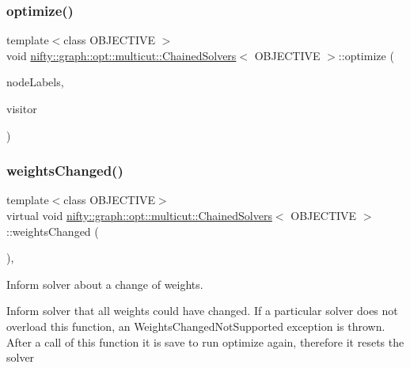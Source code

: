 \subsubsection{\texorpdfstring{optimize()}{optimize()}}
{\footnotesize\ttfamily template$<$class O\+B\+J\+E\+C\+T\+I\+VE $>$ \\
void \hyperlink{classnifty_1_1graph_1_1opt_1_1multicut_1_1ChainedSolvers}{nifty\+::graph\+::opt\+::multicut\+::\+Chained\+Solvers}$<$ O\+B\+J\+E\+C\+T\+I\+VE $>$\+::optimize (\begin{DoxyParamCaption}\item[{\hyperlink{classnifty_1_1graph_1_1opt_1_1multicut_1_1ChainedSolvers_a44d5163a198e88948d9301370c2aead5}{Node\+Labels\+Type} \&}]{node\+Labels,  }\item[{\hyperlink{classnifty_1_1graph_1_1opt_1_1multicut_1_1ChainedSolvers_a2023073333edc978eca4a4fb8d06ae1b}{Visitor\+Base\+Type} $\ast$}]{visitor }\end{DoxyParamCaption})\hspace{0.3cm}{\ttfamily [virtual]}}

\mbox{\label{classnifty_1_1graph_1_1opt_1_1multicut_1_1ChainedSolvers_ac87503e00006560417c7ab7af4685383}} 
\subsubsection{\texorpdfstring{weights\+Changed()}{weightsChanged()}}
{\footnotesize\ttfamily template$<$class O\+B\+J\+E\+C\+T\+I\+VE$>$ \\
virtual void \hyperlink{classnifty_1_1graph_1_1opt_1_1multicut_1_1ChainedSolvers}{nifty\+::graph\+::opt\+::multicut\+::\+Chained\+Solvers}$<$ O\+B\+J\+E\+C\+T\+I\+VE $>$\+::weights\+Changed (\begin{DoxyParamCaption}{ }\end{DoxyParamCaption})\hspace{0.3cm}{\ttfamily [inline]}, {\ttfamily [virtual]}}



Inform solver about a change of weights. 

Inform solver that all weights could have changed. If a particular solver does not overload this function, an Weights\+Changed\+Not\+Supported exception is thrown. After a call of this function it is save to run optimize again, therefore it resets the solver 

